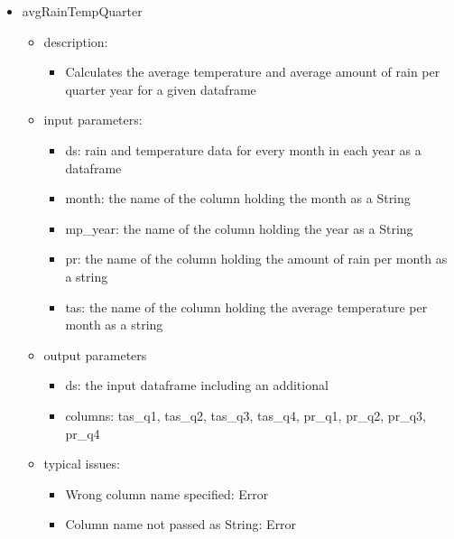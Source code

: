 \documentclass[11pt]{article}
\begin{document}
\begin{itemize}
\item avgRainTempQuarter
	\begin{itemize}
	\item description: 
		\begin{itemize}
		\item Calculates the average temperature and average amount of rain per quarter year for a given dataframe
		\end{itemize}
	\item input parameters: 
		\begin{itemize}
		\item ds: rain and temperature data for every month in each year as a dataframe
		\item month: the name of the column holding the month as a String       
		\item mp\_year: the name of the column holding the year as a String 
		\item pr: the name of the column holding the amount of rain per month as a string
		\item tas: the name of the column holding the average temperature per month as a string
		\end{itemize}
	\item output parameters
		\begin{itemize}
		\item ds: the input dataframe including an additional
		\item columns: tas\_q1, tas\_q2, tas\_q3, tas\_q4, pr\_q1, pr\_q2, pr\_q3, pr\_q4
		\end{itemize}
	\item typical issues:
		\begin{itemize}
		\item Wrong column name specified: Error 
		\item Column name not passed as String: Error
		\end{itemize}
	\end{itemize}


\end{itemize}
\end{document}
